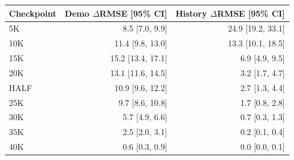 \begin{tabular}{lrr}
\hline
Checkpoint & Demo $\Delta$RMSE [95\% CI] & History $\Delta$RMSE [95\% CI] \\
\hline
5K & 8.5 [7.0, 9.9] & 24.9 [19.2, 33.1] \\
10K & 11.4 [9.8, 13.0] & 13.3 [10.1, 18.5] \\
15K & 15.2 [13.4, 17.1] & 6.9 [4.9, 9.5] \\
20K & 13.1 [11.6, 14.5] & 3.2 [1.7, 4.7] \\
HALF & 10.9 [9.6, 12.2] & 2.7 [1.3, 4.4] \\
25K & 9.7 [8.6, 10.8] & 1.7 [0.8, 2.8] \\
30K & 5.7 [4.9, 6.6] & 0.7 [0.3, 1.3] \\
35K & 2.5 [2.0, 3.1] & 0.2 [0.1, 0.4] \\
40K & 0.6 [0.3, 0.9] & 0.0 [0.0, 0.1] \\
\hline
\end{tabular}
